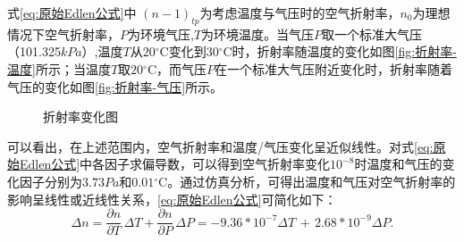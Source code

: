 式\eqref{eq:原始Edlen公式}中 \((n-1)_{tp}\)为考虑温度与气压时的空气折射率，\(n_0\)为理想情况下空气折射率，\(P\)为环境气压,\(T\)为环境温度。当气压\(P\)取一个标准大气压（101.325\(kPa\)）,温度\(T\)从\(20\)$^{\circ}$C变化到\(30\)$^{\circ}$C时，折射率随温度的变化如图\ref{fig:折射率-温度}所示；当温度\(T\)取\(20\)$^{\circ}$C，而气压\(P\)在一个标准大气压附近变化时，折射率随着气压的变化如图\ref{fig:折射率-气压}所示。
\begin{figure}[htb]
    \centering
    \caption{折射率变化图}
    \label{fig:折射率变化图}
  \end{figure}

可以看出，在上述范围内，空气折射率和温度/气压变化呈近似线性\cite{李博2021温度对激光干涉法测量气体动态压力的影响}。对式\eqref{eq:原始Edlen公式}中各因子求偏导数，可以得到空气折射率变化\(10^{-8}\)时温度和气压的变化因子分别为\(3.73Pa\)和\(0.01\)$^{\circ}$C\cite{2015Approach}。通过仿真分析，可得出温度和气压对空气折射率的影响呈线性或近线性关系，\eqref{eq:原始Edlen公式}可简化如下\cite{elden公式法在双频激光干涉仪测量系统的应用}：
\begin{equation}\label{eq:线性形式的Edlen公式}
    \Delta n=\frac{\partial n}{\partial T}\,\Delta T+\frac{\partial n}{\partial P}\,\Delta P
    =-9.36*10^{-7}\Delta T\,+\,2.68*10^{-9}\Delta P.
    \end{equation}

